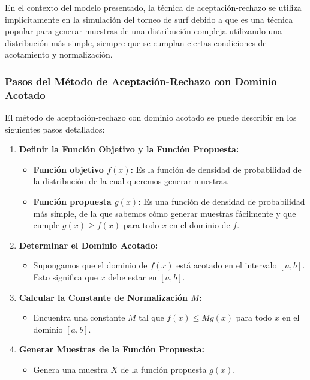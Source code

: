 \documentclass[12pt]{article}
\begin{document}
En el contexto del modelo presentado, la técnica de aceptación-rechazo se utiliza implícitamente en la simulación del torneo de surf debido a que es una técnica popular para generar muestras de una distribución compleja utilizando una distribución más simple, siempre que se cumplan ciertas condiciones de acotamiento y normalización.

\subsubsection*{Pasos del Método de Aceptación-Rechazo con Dominio Acotado}

El método de aceptación-rechazo con dominio acotado se puede describir en los siguientes pasos detallados:

\begin{enumerate}

    \item \textbf{Definir la Función Objetivo y la Función Propuesta:}
    \begin{itemize}
        \item \textbf{Función objetivo \( f(x) \):} Es la función de densidad de probabilidad de la distribución de la cual queremos generar muestras.
        \item \textbf{Función propuesta \( g(x) \):} Es una función de densidad de probabilidad más simple, de la que sabemos cómo generar muestras fácilmente y que cumple \( g(x) \geq f(x) \) para todo \( x \) en el dominio de \( f \).
    \end{itemize}

    \item \textbf{Determinar el Dominio Acotado:}
    \begin{itemize}
        \item Supongamos que el dominio de \( f(x) \) está acotado en el intervalo \([a, b]\). Esto significa que \( x \) debe estar en \([a, b]\).
    \end{itemize}

    \item \textbf{Calcular la Constante de Normalización \( M \):}
    \begin{itemize}
        \item Encuentra una constante \( M \) tal que \( f(x) \leq M g(x) \) para todo \( x \) en el dominio \([a, b]\).
    \end{itemize}

    \item \textbf{Generar Muestras de la Función Propuesta:}
    \begin{itemize}
        \item Genera una muestra \( X \) de la función propuesta \( g(x) \).
    \end{itemize}


\end{enumerate}
\end{document}

